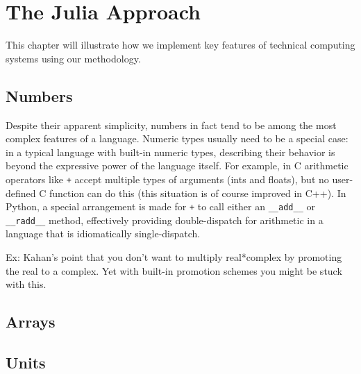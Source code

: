 \chapter{The Julia Approach}

This chapter will illustrate how we implement key features of technical computing
systems using our methodology.


\section{Numbers}

Despite their apparent simplicity, numbers in fact tend to be among the most
complex features of a language. Numeric types usually need to be a special
case: in a typical language with built-in numeric types, describing their
behavior is beyond the expressive power of the language itself. For example,
in C arithmetic operators like \texttt{+} accept multiple types of arguments
(ints and floats), but no user-defined C function can do this (this situation
is of course improved in C++). In Python, a special arrangement is made for
\texttt{+} to call either an \texttt{\_\_add\_\_} or \texttt{\_\_radd\_\_} method, effectively
providing double-dispatch for arithmetic in a language that is idiomatically
single-dispatch.

Ex: Kahan's point that you don't want to multiply real*complex by
promoting the real to a complex. Yet with built-in promotion schemes
you might be stuck with this.


\section{Arrays}



\section{Units}

